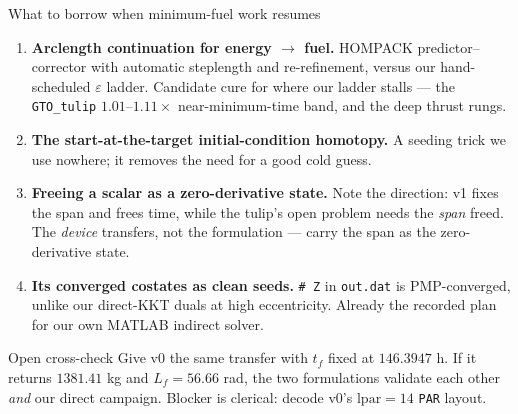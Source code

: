 \documentclass[10pt,aspectratio=169]{beamer}
\newcommand{\code}[1]{\texttt{\small #1}}
\newcommand{\file}[1]{\texttt{\small #1}}
\newcommand{\Lf}{L_f}
\begin{document}
\begin{frame}{What to borrow when minimum-fuel work resumes}

\begin{enumerate}
\item \textbf{Arclength continuation for energy $\to$ fuel.} HOMPACK
      predictor--corrector with automatic steplength and re-refinement, versus
      our hand-scheduled $\varepsilon$ ladder. Candidate cure for where our
      ladder stalls --- the \file{GTO\_tulip} $1.01$--$1.11\times$
      near-minimum-time band, and the deep thrust rungs.
\item \textbf{The start-at-the-target initial-condition homotopy.} A seeding
      trick we use nowhere; it removes the need for a good cold guess.
\item \textbf{Freeing a scalar as a zero-derivative state.} Note the
      direction: v1 fixes the span and frees time, while the tulip's open
      problem needs the \emph{span} freed. The \emph{device} transfers, not
      the formulation --- carry the span as the zero-derivative state.
\item \textbf{Its converged costates as clean seeds.} \code{\# Z} in
      \file{out.dat} is PMP-converged, unlike our direct-KKT duals at high
      eccentricity. Already the recorded plan for our own MATLAB indirect
      solver.
\end{enumerate}

\begin{block}{Open cross-check}
Give v0 the same transfer with $t_f$ fixed at $146.3947$ h. If it returns
$1381.41$ kg and $\Lf = 56.66$ rad, the two formulations validate each other
\emph{and} our direct campaign. Blocker is clerical: decode v0's
$\mathrm{lpar} = 14$ \code{PAR} layout.
\end{block}
\end{frame}
\end{document}
